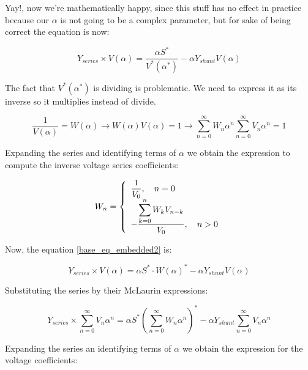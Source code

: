 \documentclass[nols,a4paper,twoside,notoc,fleqn]{tufte-book}
\begin{document}
	Yay!, now we're mathematically happy, since this stuff has no effect in practice because our $\alpha$ is not going to be a complex parameter, but for sake of being correct the equation is now:
	
	\begin{equation}
	{{Y}_{series}\times {V}( \alpha )} = \frac{ \alpha{S}^*}{{V}^*( \alpha^* )} - \alpha {Y}_{shunt} {V}( \alpha )
	\label{base_eq_embedded2}
	\end{equation}
	



The fact that ${V}^*( \alpha^* )$ is dividing is problematic. We need to express it as its inverse so it multiplies instead of divide.

\begin{equation} 
\frac{1}{{V}( \alpha)} = {W}( \alpha ) \longrightarrow {W}( \alpha ) {V}( \alpha) = 1 \longrightarrow \sum_{n=0}^{\infty}{{W}_n \alpha^n}  \sum_{n=0}^{\infty}{{V}_n \alpha^n} = 1
\end{equation}

Expanding the series and identifying terms of $\alpha$ we obtain the expression to compute the inverse voltage series coefficients:

\begin{equation}
{W}_n =
\left\{
\begin{array}{ll}
\mathlarger{\frac{1}{{V}_0}}, \quad n=0\\
\mathlarger{-\frac{\mathlarger{\sum_{k=0}^{n}{W}_k {V}_{n-k}}}{{V}_0}}, \quad n>0
\end{array}
\right.
\end{equation}


Now, the equation \ref{base_eq_embedded2} is:

\begin{equation}
{{Y}_{series}\times {V}( \alpha )} = \alpha{S}^* \cdot {W}( \alpha)^*  - \alpha {Y}_{shunt} {V}( \alpha )
\label{base_eq_embedded3}
\end{equation}

Substituting the series by their McLaurin expressions:

\begin{equation}
{{Y}_{series}\times \sum_{n=0}^{\infty}{{V}_n \alpha^n}} = \alpha{S}^* \left(\sum_{n=0}^{\infty}{{W}_n \alpha^n}\right)^*  - \alpha {Y}_{shunt} \sum_{n=0}^{\infty}{{V}_n \alpha^n}
\label{base_eq_embedded4}
\end{equation}

Expanding the series an identifying terms of $\alpha$ we obtain the expression for the voltage coefficients:
\end{document}
